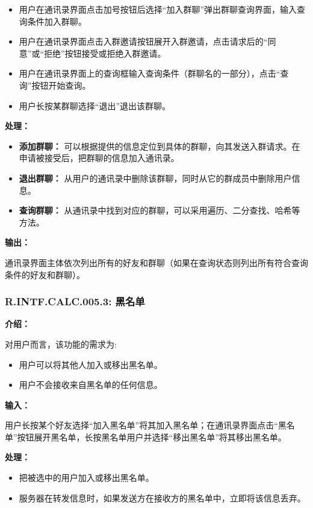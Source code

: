 \begin{itemize}
  \item 用户在通讯录界面点击加号按钮后选择“加入群聊”弹出群聊查询界面，输入查询条件加入群聊。
  \item 用户在通讯录界面点击入群邀请按钮展开入群邀请，点击请求后的“同意”或“拒绝”按钮接受或拒绝入群邀请。
  \item 用户在通讯录界面上的查询框输入查询条件（群聊名的一部分），点击“查询”按钮开始查询。
  \item 用户长按某群聊选择“退出”退出该群聊。
\end{itemize}

\textbf{处理：}

\begin{itemize}
  \item \textbf{添加群聊：} 可以根据提供的信息定位到具体的群聊，向其发送入群请求。在申请被接受后，把群聊的信息加入通讯录。
  \item \textbf{退出群聊：} 从用户的通讯录中删除该群聊，同时从它的群成员中删除用户信息。
  \item \textbf{查询群聊：} 从通讯录中找到对应的群聊，可以采用遍历、二分查找、哈希等方法。
\end{itemize}

\textbf{输出：}

通讯录界面主体依次列出所有的好友和群聊（如果在查询状态则列出所有符合查询条件的好友和群聊）。

\subsubsection{R.INTF.CALC.005.3: 黑名单}

\textbf{介绍：}

对用户而言，该功能的需求为:
\begin{itemize}
  \item 用户可以将其他人加入或移出黑名单。
  \item 用户不会接收来自黑名单的任何信息。
\end{itemize}

\textbf{输入：}

用户长按某个好友选择“加入黑名单”将其加入黑名单；在通讯录界面点击“黑名单”按钮展开黑名单，长按黑名单用户并选择“移出黑名单”将其移出黑名单。

\textbf{处理：}

\begin{itemize}
  \item 把被选中的用户加入或移出黑名单。
  \item 服务器在转发信息时，如果发送方在接收方的黑名单中，立即将该信息丢弃。
\end{itemize}

